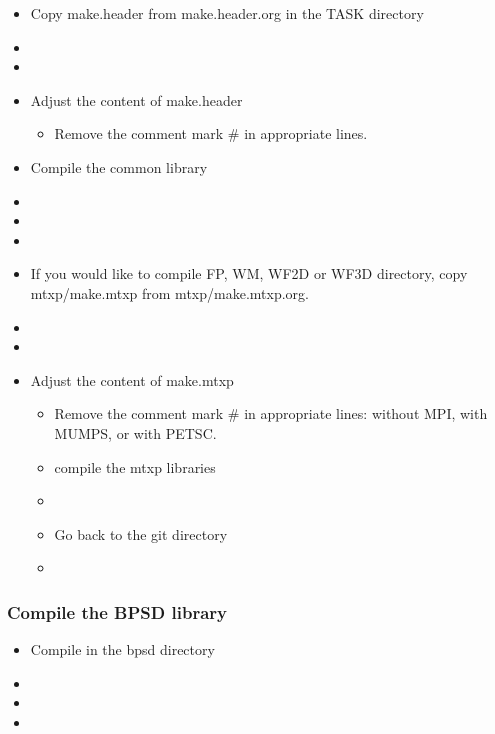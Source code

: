 \documentclass[11pt]{article}
\begin{document}
\begin{itemize}
\item
Copy make.header from make.header.org in the TASK directory 
\item[\qquad]
\item[\qquad]
\item
Adjust the content of make.header
\begin{itemize}
\item
Remove the comment mark \# in appropriate lines.
\end{itemize}
\item
Compile the common library
\item[\qquad]
\item[\qquad]
\item[\qquad]

\item
If you would like to compile FP, WM, WF2D or WF3D directory, copy
mtxp/make.mtxp from mtxp/make.mtxp.org.
\item[\qquad]
\item[\qquad]
\item
Adjust the content of make.mtxp
\begin{itemize}
\item
Remove the comment mark \# in appropriate lines: without MPI, with
MUMPS, or with PETSC.
\item
compile the mtxp libraries
\item[\qquad]
\item
Go back to the git directory
\item[\qquad]
\end{itemize}
\end{itemize}

\subsubsection{Compile the BPSD library}

\begin{itemize}
\item
Compile in the bpsd directory
\item[\qquad]
\item[\qquad]
\item[\qquad]
\end{itemize}
\end{document}
